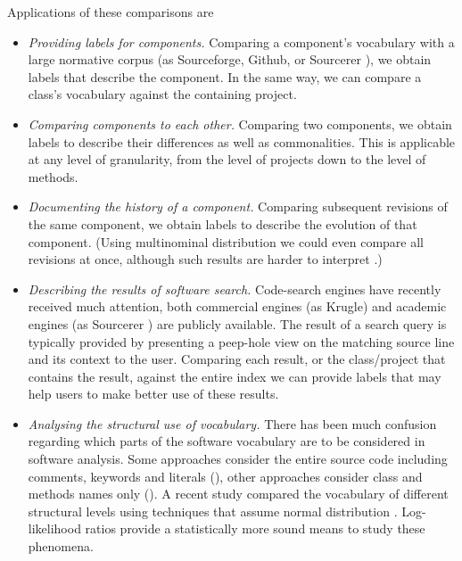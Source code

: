 Applications of these comparisons are
\begin{itemize}
\item \emph{Providing labels for components.} Comparing a component's vocabulary with a large normative corpus (as \eg Sourceforge, Github, or Sourcerer \cite{Bajrach09SUITE}), we obtain labels that describe the component. In the same way, we can compare a class's vocabulary against the containing project.
\item \emph{Comparing components to each other.} Comparing two components, we obtain labels to describe their differences as well as commonalities. This is applicable at any level of granularity, from the level of projects down to the level of methods.
\item \emph{Documenting the history of a component.} Comparing subsequent revisions of the same component, we obtain labels to describe the evolution of that component. (Using multinominal distribution we could even compare all revisions at once, although such results are harder to interpret \cite{Dunning}.)
\item \emph{Describing the results of software search.} Code-search engines have recently received much attention, both commercial engines (as \eg Krugle) and academic engines (as \eg Sourcerer \cite{Bajrach09SUITE}) are publicly available. The result of a search query is typically provided by presenting a peep-hole view on the matching source line and its context to the user. Comparing each result, or the class/project that contains the result, against the entire index we can provide labels that may help users to make better use of these results.
\item \emph{Analysing the structural use of vocabulary.} There has been much confusion regarding which parts of the software vocabulary are to be considered in software analysis. Some approaches consider the entire source code including comments, keywords and literals (\eg \cite{Kuhn08b,Kuhn07a}), other approaches consider class and methods names only (\eg \cite{Baldi08OOPSLA,EinarHoest}). A recent study compared the vocabulary of different structural levels using techniques that assume normal distribution \cite{Linstead09SUITE}. Log-likelihood ratios provide a statistically more sound means to study these phenomena.
\end{itemize}


